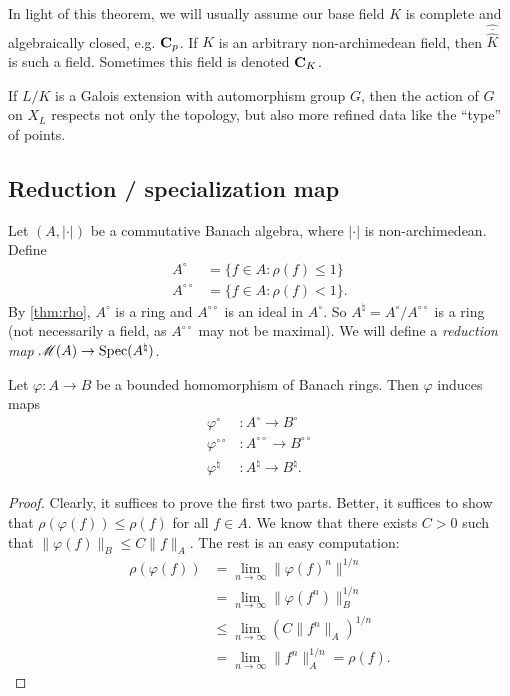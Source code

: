 In light of this theorem, we will usually assume our base field $K$ is 
complete and algebraically closed, e.g. $\mathbf{C}_p$. If $K$ is an arbitrary 
non-archimedean field, then $\widehat{\overline{\widehat K}}$ is such a field. 
Sometimes this field is denoted $\mathbf{C}_K$. 

If $L/K$ is a Galois extension with automorphism group $G$, then the action of 
$G$ on $X_L$ respects not only the topology, but also more refined data like 
the ``type'' of points. 












\subsection{Reduction / specialization map}

Let $(A,|\cdot|)$ be a commutative Banach algebra, where $|\cdot|$ is 
non-archimedean. Define 
\begin{align*}
	A^\circ &= \{f\in A\colon \rho(f)\leqslant 1\} \\
	A^{\circ\circ} &= \{f\in A\colon \rho(f)<1\} .
\end{align*}
By \autoref{thm:rho}, $A^\circ$ is a ring and $A^{\circ\circ}$ is an ideal in 
$A^\circ$. So $A^\natural=A^\circ/A^{\circ\circ}$ is a ring (not necessarily a 
field, as $A^{\circ\circ}$ may not be maximal). We will define a \emph{reduction 
map} $\operatorname{\mathscr{M}}(A)\to \operatorname{Spec}(A^\natural)$. 

\begin{lemma}
Let $\varphi\colon A\to B$ be a bounded homomorphism of Banach rings. Then 
$\varphi$ induces maps 
\begin{align*}
	\varphi^\circ &\colon A^\circ\to B^\circ \\
	\varphi^{\circ\circ} &\colon A^{\circ\circ}\to B^{\circ\circ} \\ 
	\varphi^\natural &\colon A^\natural \to B^\natural .
\end{align*}
\end{lemma}
\begin{proof}
Clearly, it suffices to prove the first two parts. Better, it suffices to 
show that $\rho(\varphi(f))\leqslant \rho(f)$ for all $f\in A$. We know that 
there exists $C>0$ such that $\|\varphi(f)\|_B\leqslant C \|f\|_A$. The rest 
is an easy computation:
\begin{align*}
	\rho(\varphi(f)) 
		&= \lim_{n\to \infty} \|\varphi(f)^n\|^{1/n} \\
		&= \lim_{n\to \infty} \| \varphi(f^n)\|_B^{1/n} \\
		&\leqslant \lim_{n\to \infty} \left(C \|f^n\|_A\right)^{1/n} \\
		&= \lim_{n\to \infty} \|f^n\|^{1/n}_A = \rho(f) .
\end{align*}
\end{proof}

